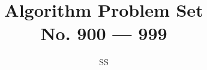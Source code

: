 \documentclass[a4paper,12pt]{article}
\title{Algorithm Problem Set \\ \large No. 900 --- 999}
\author{SS}
\begin{document}
\renewcommand{\thelstlisting}{\thesection.\arabic{lstlisting}}
\newcommand{\fcc}[1]{\lstinline[language=C++, basicstyle=\small\ttfamily, keywordstyle=\bfseries\color{green!40!black}]|#1|}
\newcommand{\fcj}[1]{\lstinline[language=Java, basicstyle=\small\ttfamily, keywordstyle=\bfseries\color{green!40!black}]|#1|}
\maketitle
%
%
%

%
%
%
%
%
%
%
%
%
%
%
%
%
%
%
%
%
%
%
%
%
%
%
%
%
%
%
%
%
%
%
%
%
%
%
%
%
%
%
%
%
%
%
%
%
%
%
%
%
%
%
%
%
%
%
%
%
%
%
%
%
%
%
%
%
%
%
%
%
%
%
%
%
%
%
%
%
%
%
%
%
%
%
%
%
%
%
%
%
%
%
%
%
%
%
%
\end{document}
